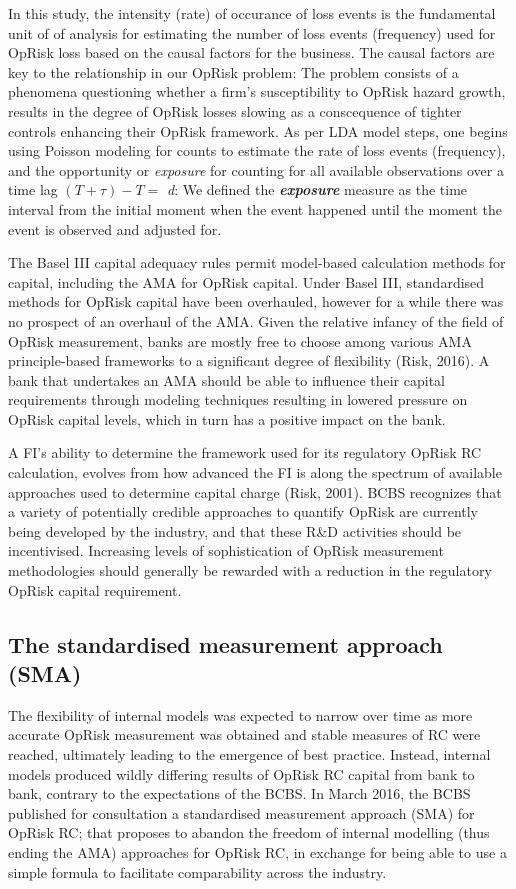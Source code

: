 \documentclass{DissertateUSU}
\begin{document}
In this study, the intensity (rate) of occurance of loss events is the
fundamental unit of of analysis for estimating the number of loss events
(frequency) used for OpRisk loss based on the causal factors for the
business. The causal factors are key to the relationship in our OpRisk
problem: The problem consists of a phenomena questioning whether a
firm's susceptibility to OpRisk hazard growth, results in the degree of
OpRisk losses slowing as a conscequence of tighter controls enhancing
their OpRisk framework. As per LDA model steps, one begins using Poisson
modeling for counts to estimate the rate of loss events (frequency), and
the opportunity or \emph{exposure} for counting for all available
observations over a time lag \((T+\tau) - T =\) \emph{d}: We defined the
\emph{\textbf{exposure}} measure as the time interval from the initial
moment when the event happened until the moment the event is observed
and adjusted for.\medskip

The Basel III capital adequacy rules permit model-based calculation
methods for capital, including the AMA for OpRisk capital. Under Basel
III, standardised methods for OpRisk capital have been overhauled,
however for a while there was no prospect of an overhaul of the AMA.
Given the relative infancy of the field of OpRisk measurement, banks are
mostly free to choose among various AMA principle-based frameworks to a
significant degree of flexibility (Risk, 2016). A bank that undertakes
an AMA should be able to influence their capital requirements through
modeling techniques resulting in lowered pressure on OpRisk capital
levels, which in turn has a positive impact on the bank.\medskip

A FI's ability to determine the framework used for its regulatory OpRisk
RC calculation, evolves from how advanced the FI is along the spectrum
of available approaches used to determine capital charge (Risk, 2001).
BCBS recognizes that a variety of potentially credible approaches to
quantify OpRisk are currently being developed by the industry, and that
these R\&D activities should be incentivised. Increasing levels of
sophistication of OpRisk measurement methodologies should generally be
rewarded with a reduction in the regulatory OpRisk capital requirement.

\subsection{The standardised measurement approach (SMA)}

The flexibility of internal models was expected to narrow over time as
more accurate OpRisk measurement was obtained and stable measures of RC
were reached, ultimately leading to the emergence of best practice.
Instead, internal models produced wildly differing results of OpRisk RC
capital from bank to bank, contrary to the expectations of the BCBS. In
March 2016, the BCBS published for consultation a standardised
measurement approach (SMA) for OpRisk RC; that proposes to abandon the
freedom of internal modelling (thus ending the AMA) approaches for
OpRisk RC, in exchange for being able to use a simple formula to
facilitate comparability across the industry.\medskip
\end{document}
